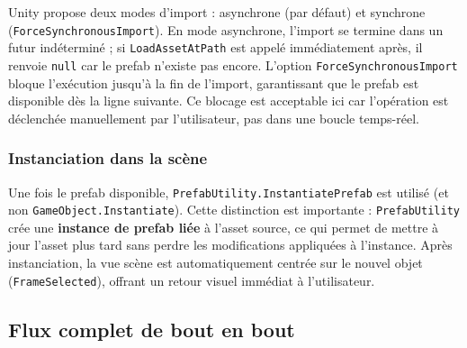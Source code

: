 \documentclass[12pt,a4paper,oneside]{report}
\begin{document}
Unity propose deux modes d'import : asynchrone (par défaut) et
synchrone (\texttt{ForceSynchronousImport}). En mode asynchrone,
l'import se termine dans un futur indéterminé ; si
\texttt{LoadAssetAtPath} est appelé immédiatement après, il renvoie
\texttt{null} car le prefab n'existe pas encore. L'option
\texttt{ForceSynchronousImport} bloque l'exécution jusqu'à la fin
de l'import, garantissant que le prefab est disponible dès la
ligne suivante. Ce blocage est acceptable ici car l'opération est
déclenchée manuellement par l'utilisateur, pas dans une boucle temps-réel.

\subsubsection{Instanciation dans la scène}

Une fois le prefab disponible, \texttt{PrefabUtility.InstantiatePrefab}
est utilisé (et non \texttt{GameObject.Instantiate}). Cette
distinction est importante : \texttt{PrefabUtility} crée une
\textbf{instance de prefab liée} à l'asset source, ce qui permet de
mettre à jour l'asset plus tard sans perdre les modifications
appliquées à l'instance. Après instanciation, la vue scène est
automatiquement centrée sur le nouvel objet (\texttt{FrameSelected}),
offrant un retour visuel immédiat à l'utilisateur.

\subsection{Flux complet de bout en bout}
\end{document}
